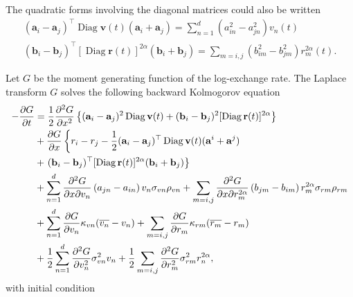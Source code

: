 \documentclass[12pt]{report}
\begin{document}
The quadratic forms involving the diagonal matrices could also be written
\begin{gather}
(\mathbf{a}_{i}-\mathbf{a}_{j})^{\top} \operatorname{Diag}\mathbf{v}(t)(\mathbf{a}_{i}+\mathbf{a}_{j}) =\sum_{n=1}^{d}(a_{in}^2-a_{jn}^2) v_{n}(t) \\
(\mathbf{b}_{i}-\mathbf{b}_{j})^\top [{\operatorname{Diag}\mathbf{r}(t)}]^{2\alpha}(\mathbf{b}_{i}+\mathbf{b}_{j}) =\sum_{m= i,j}(b_{im}^2-b_{jm}^2) r_{m}^{2\alpha}(t).
\end{gather}


Let $G$ be the moment generating function of the log-exchange rate. The Laplace transform $G$ solves the following backward Kolmogorov equation \cite{karatzas1991brownian}
\begin{align}
-\frac{\partial G}{\partial t}&= \frac{1}{2} \frac{\partial^{2} G}{\partial x^{2}}\left\{(\mathbf{a}_{i}-\mathbf{a}_{j})^{2} \operatorname{Diag}\mathbf{v}(t) + (\mathbf{b}_{i}-\mathbf{b}_{j})^{2} [{\operatorname{Diag}\mathbf{r}(t)}]^{2\alpha}\right\} \notag\\
&+\frac{\partial G}{\partial x} \left\{r_{i}-r_{j}-\frac{1}{2}(\mathbf{a}_{i}-\mathbf{a}_{j})^{\top} \operatorname{Diag}\mathbf{v}(t)(\mathbf{a}^{i}+\mathbf{a}^{j}) \right. \notag\\
&+ \left.(\mathbf{b}_{i}-\mathbf{b}_{j})^{\top} [{\operatorname{Diag}\mathbf{r}(t)}]^{2\alpha}(\mathbf{b}_{i}+\mathbf{b}_{j})\right\}  \notag\\
&+\sum_{n=1}^{d} \frac{\partial^{2} G}{\partial x \partial v_{n}}\left(a_{jn}-a_{in}\right) v_{n} \sigma_{vn} \rho_{vn} + \sum_{m= i,j} \frac{\partial^{2} G}{\partial x \partial r_{m}^{2\alpha}}\left(b_{jm}-b_{im}\right) r_{m}^{2\alpha} \sigma_{rm} \rho_{rm}\notag \\
&+\sum_{n=1}^{d} \frac{\partial G}{\partial v_{n}} \kappa_{vn}(\overline{v_{n}}-v_{n}) + \sum_{m= i,j} \frac{\partial G}{\partial r_{m}} \kappa_{rm}(\overline{r_{m}}-r_{m})\notag\\
&+\frac{1}{2} \sum_{n=1}^{d} \frac{\partial^{2} G}{\partial v_{n}^{2}} \sigma_{vn}^{2} v_{n} +\frac{1}{2} \sum_{m= i,j} \frac{\partial^{2} G}{\partial r_{m}^{2}} \sigma_{rm}^{2} r_{n}^{2\alpha}, 
\end{align}
with initial condition
\end{document}
